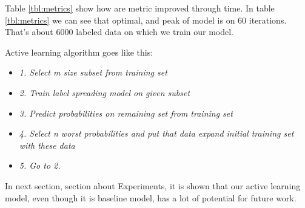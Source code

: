 \documentclass[10pt, a4paper]{article}
\begin{document}
Table \ref{tbl:metrics} show how are metric improved through time. In table \ref{tbl:metrics} we can see that optimal, and peak of model is on $60$ iterations. That's about $6000$ labeled data on which we train our model.

Active learning algorithm goes like this:
\begin{itemize}
	\item \textit{1. Select m size subset from training set}
	\item \textit{2. Train label spreading model on given subset}
	\item \textit{3. Predict probabilities on remaining set from training set}
	\item \textit{4. Select n worst probabilities and put that data expand initial training set with these data}
	\item \textit{5. Go to 2.}
\end{itemize}

In next section, section about Experiments, it is shown that our active learning model, even though it is baseline model, has a lot of potential for future work.
\end{document}
